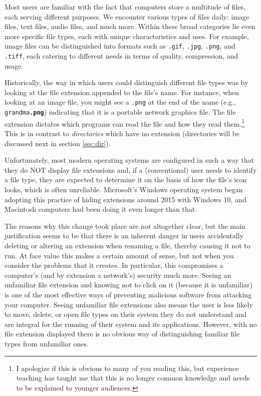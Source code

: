 Most users are familiar with the fact that computers store a multitude of files, each serving different purposes. We encounter various types of files daily: image files, text files, audio files, and much more. Within these broad categories lie even more specific file types, each with unique characteristics and uses. For example, image files can be distinguished into formats such as \texttt{.gif}, \texttt{.jpg}, \texttt{.png}, and \texttt{.tiff}, each catering to different needs in terms of quality, compression, and usage.

Historically, the way in which users could distinguish different file types was by looking at the \gls{file extension} appended to the file's name. For instance, when looking at an image file, you might see a \texttt{.png} at the end of the name (e.g., \texttt{grandma\textbf{.png}}) indicating that it is a portable network graphics file. The file extension dictates which programs can read the file and how they read them.\footnote{I apologize if this is obvious to many of you reading this, but experience teaching has taught me that this is no longer common knowledge and needs to be explained to younger audiences.} This is in contrast to \textit{directories} which have no extension (directories will be discussed next in section \ref{sec:dir}).

Unfortunately, most modern operating systems are configured in such a way that they do NOT display file extensions and, if a (conventional) user needs to identify a file type, they are expected to determine it on the basis of how the file's icon looks, which is often unreliable. Microsoft's Windows operating system began adopting this practice of hiding extensions around 2015 with Windows 10, and Macintosh computers had been doing it even longer than that.

The reasons why this change took place are not altogether clear, but the main justification seems to be that there is an inherent danger in users accidentally deleting or altering an extension when renaming a file, thereby causing it not to run. At face value this makes a certain amount of sense, but not when you consider the problems that it creates. In particular, this compromises a computer's (and by extension a network's) security much more. Seeing an unfamiliar file extension and knowing not to click on it (because it is unfamiliar) is one of the most effective ways of preventing malicious software from attacking your computer. Seeing unfamiliar file extensions also means the user is less likely to move, delete, or open file types on their system they do not understand and are integral for the running of their system and its applications. However, with no file extension displayed there is no obvious way of distinguishing familiar file types from unfamiliar ones.

